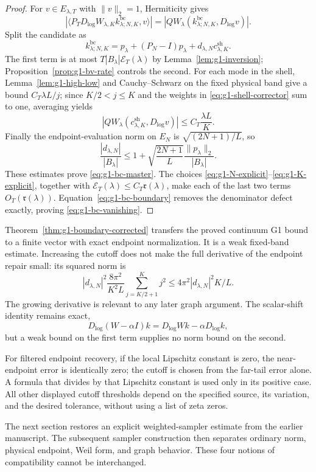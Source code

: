 \documentclass[11pt]{article}
\theoremstyle{remark}
\begin{document}
\begin{proof}
For $v\in E_{\lambda,T}$ with $\|v\|_2=1$, Hermiticity gives
\[
 |\langle P_TD_{\log}W_{\lambda,K}
 k^{\mathrm{bc}}_{\lambda;N,K},v\rangle|
 =|QW_\lambda(k^{\mathrm{bc}}_{\lambda;N,K},D_{\log}v)|.
\]
Split the candidate as
\[
 k^{\mathrm{bc}}_{\lambda;N,K}
 =p_\lambda+(P_N-I)p_\lambda+d_{\lambda,N}c^{\mathrm{sh}}_{\lambda,K}.
\]
The first term is at most $T|B_\lambda|\mathcal E_T(\lambda)$ by
Lemma~\ref{lem:g1-inversion}; Proposition~\ref{prop:g1-bv-rate} controls the
second.  For each mode in the shell, Lemma~\ref{lem:g1-high-low} and
Cauchy--Schwarz on the fixed physical band give a bound
$C_T\lambda L/j$; since $K/2<j\le K$ and the weights in
\eqref{eq:g1-shell-corrector} sum to one, averaging yields
\[
 |QW_\lambda(c^{\mathrm{sh}}_{\lambda,K},D_{\log}v)|
 \le C_T\frac{\lambda L}{K}.
\]
Finally the endpoint-evaluation norm on $E_N$ is
$\sqrt{(2N+1)/L}$, so
\[
 \frac{|d_{\lambda,N}|}{|B_\lambda|}
 \le1+\sqrt{\frac{2N+1}{L}}
       \frac{\|p_\lambda\|_2}{|B_\lambda|}.
\]
These estimates prove \eqref{eq:g1-bc-master}.  The choices
\eqref{eq:g1-N-explicit}--\eqref{eq:g1-K-explicit}, together with
$\mathcal E_T(\lambda)\le C_T\mathfrak r(\lambda)$, make each of the last two
terms $O_T(\mathfrak r(\lambda))$.  Equation~\eqref{eq:g1-bc-boundary} removes
the denominator defect exactly, proving \eqref{eq:g1-bc-vanishing}.
\end{proof}

Theorem~\ref{thm:g1-boundary-corrected} transfers the proved continuum G1
bound to a finite vector with exact endpoint normalization. It is a weak
fixed-band estimate. Increasing the cutoff does not make the full
derivative of the endpoint repair small: its squared norm is
\[
 |d_{\lambda,N}|^2\frac{8\pi^2}{K^2L}
 \sum_{j=K/2+1}^{K}j^2\le
 4\pi^2|d_{\lambda,N}|^2K/L.
\]
The growing derivative is relevant to any later graph argument.
The scalar-shift identity remains exact,
\[
 D_{\log}(W-\alpha I)k=D_{\log}Wk-\alpha D_{\log}k,
\]
but a weak bound on the first term supplies no norm bound on the second.

For filtered endpoint recovery, if the local Lipschitz constant is zero,
the near-endpoint error is identically zero; the cutoff is chosen from
the far-tail error alone. A formula that divides by that Lipschitz
constant is used only in its positive case. All other displayed cutoff
thresholds depend on the specified source, its variation, and the desired
tolerance, without using a list of zeta zeros.

The next section restores an explicit weighted-sampler estimate from the
earlier manuscript. The subsequent sampler construction then separates
ordinary norm, physical endpoint, Weil form, and graph behavior. These
four notions of compatibility cannot be interchanged.
\end{document}
